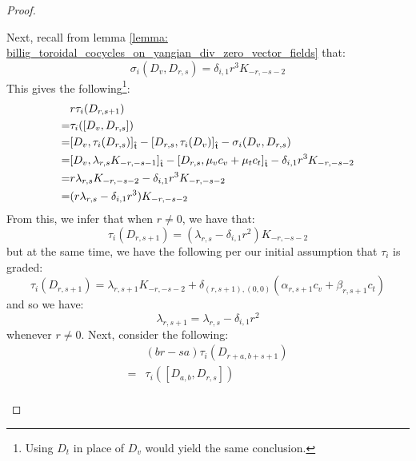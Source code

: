 \begin{proof}
\begin{enumerate}
                    Next, recall from lemma \ref{lemma: billig_toroidal_cocycles_on_yangian_div_zero_vector_fields} that:
                        $$\sigma_i(D_v, D_{r, s}) = \delta_{i, 1} r^3 K_{-r, -s - 2}$$
                    This gives the following\footnote{Using $D_t$ in place of $D_v$ would yield the same conclusion.}:
                        $$
                            \begin{aligned}
                                & r \tau_i(D_{r, s + 1})
                                \\
                                = & \tau_i([D_v, D_{r, s}])
                                \\
                                = & [D_v, \tau_i(D_{r, s})]_{\extendedtoroidal} - [D_{r, s}, \tau_i(D_v)]_{\extendedtoroidal} - \sigma_i(D_v, D_{r, s})
                                \\
                                = & [D_v, \lambda_{r, s} K_{-r, -s - 1}]_{\extendedtoroidal} - [D_{r, s}, \mu_v c_v + \mu_t c_t]_{\extendedtoroidal} - \delta_{i, 1} r^3 K_{-r, -s - 2}
                                \\
                                = & r \lambda_{r, s} K_{-r, -s - 2} - \delta_{i, 1} r^3 K_{-r, -s - 2}
                                \\
                                = & ( r \lambda_{r, s} - \delta_{i, 1} r^3 ) K_{-r, -s - 2}
                            \end{aligned}
                        $$
                    From this, we infer that when $r \not = 0$, we have that:
                        $$\tau_i(D_{r, s + 1}) = (\lambda_{r, s} - \delta_{i, 1} r^2) K_{-r, -s - 2}$$
                    but at the same time, we have the following per our initial assumption that $\tau_i$ is graded:
                        $$\tau_i(D_{r, s + 1}) = \lambda_{r, s + 1} K_{-r, -s - 2} + \delta_{(r, s + 1), (0, 0)} ( \alpha_{r, s + 1} c_v + \beta_{r, s + 1} c_t )$$
                    and so we have:
                        $$\lambda_{r, s + 1} = \lambda_{r, s} - \delta_{i, 1} r^2$$
                    whenever $r \not = 0$. Next, consider the following:
                        $$
                            \begin{aligned}
                                & (br - sa) \tau_i(D_{r + a, b + s + 1})
                                \\
                                = & \tau_i( [D_{a, b}, D_{r, s}] )
                                \\

\end{aligned}$$
\end{enumerate}
\end{proof}
